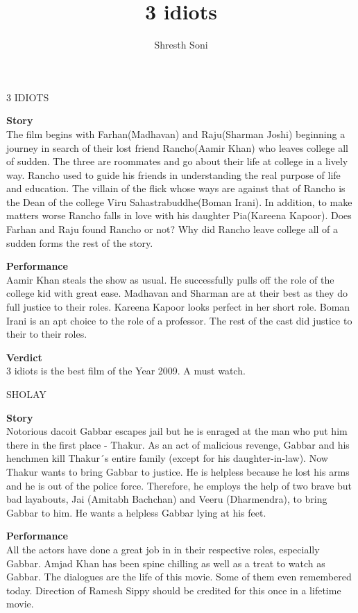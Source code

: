 \documentclass{article}
\title{ 3 idiots}
\author{Shresth Soni}
\begin{document}
\begin{center}
\textmd {\huge 3 IDIOTS}
\end{center}

\begin{flushleft}
\textbf{Story}\\
The film begins with Farhan(Madhavan) and Raju(Sharman Joshi) beginning a journey in search of their lost friend Rancho(Aamir Khan) who leaves college all of sudden. The three are roommates and go about their life at college in a lively way. Rancho used to guide his friends in understanding the real purpose of life and education. The villain of the flick whose ways are against that of Rancho is the Dean of the college Viru Sahastrabuddhe(Boman Irani). In addition, to make matters worse Rancho falls in love with his daughter Pia(Kareena Kapoor). Does Farhan and Raju found Rancho or not? Why did Rancho leave college all of a sudden forms the rest of the story.\\
\vspace{3mm}

\textbf{Performance}\\
Aamir Khan steals the show as usual. He successfully pulls off the role of the college kid with great ease. Madhavan and Sharman are at their best as they do full justice to their roles. Kareena Kapoor looks perfect in her short role. Boman Irani is an apt choice to the role of a professor. The rest of the cast did justice to their to their roles.\\
\vspace{3mm}

\textbf{Verdict}\\
3 idiots is the best film of the Year 2009. A must watch.
\vspace{3mm}

\begin{center}
\textmd {\huge SHOLAY}
\end{center}
\textbf{Story}\\
Notorious dacoit Gabbar escapes jail but he is enraged at the man who put him there in the first place - Thakur. As an act of malicious revenge, Gabbar and his henchmen kill Thakur´s entire family (except for his daughter-in-law). Now Thakur wants to bring Gabbar to justice. He is helpless because he lost his arms and he is out of the police force. Therefore, he employs the help of two brave but bad layabouts, Jai (Amitabh Bachchan) and Veeru (Dharmendra), to bring Gabbar to him. He wants a helpless Gabbar lying at his feet.\\
\vspace{3mm}

\textbf{Performance}\\
All the actors have done a great job in in their respective roles, especially Gabbar. Amjad Khan has been spine chilling as well as a treat to watch as Gabbar. The dialogues are the life of this movie. Some of them even remembered today. Direction of Ramesh Sippy should be credited for this once in a lifetime movie.\\ 
\vspace{3mm}
\end{flushleft}
\end{document}

